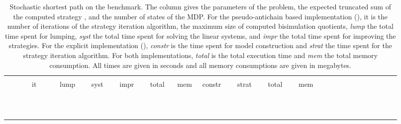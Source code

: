 \begin{table}[h!]
	\caption{Stochastic shortest path on the  benchmark. The column  gives the parameters of the problem,  the expected truncated sum of the computed strategy , and  the number of states of the MDP.
For the pseudo-antichain based implementation (), it is the number of iterations of the strategy iteration algorithm,  the maximum size of computed bisimulation quotients, \textit{lump} the total time spent for lumping, \textit{syst} the total time spent for solving the linear systems, and \textit{impr} the total time spent for improving the strategies. For the explicit implementation (), \textit{constr} is the time spent for model construction and \textit{strat} the time spent for the strategy iteration algorithm. For both implementations, \textit{total} is the total execution time and \textit{mem} the total memory consumption. All times are given in seconds and all memory consumptions are given in megabytes.}
	\label{table:STRIPS1}
	\centering
		\scriptsize
 		\begin{tabular}{|r|r|r||r|r|r|r|r|r|r||r|r|r|r|r|r|r|r|r|r|r|r|r|r|r|}
		\hline
	  	& & & \multicolumn{7}{|c||}{{\small }} & \multicolumn{4}{|c|}{{\small }}\rule[-2pt]{0pt}{10pt}\\
		 &   &   & \ it \  &  & \ lump  \ &  \ syst \  &  \ impr  \ & \  total \  & mem & \ constr \  & \ strat \ & \ total \ & \ mem\ \rule[-3pt]{0pt}{10pt}\\
\hline\hline
 &  &  &  &  &  &  &   &  &  &  &   &  & \rule[-3pt]{0pt}{10pt}\\
 &  &  &  &  &  &  &   &  &  &  &   &  & \rule[-3pt]{0pt}{10pt}\\
 &  &  &  &  &  &  &   &  &  &  &   &  & \rule[-3pt]{0pt}{10pt}\\
 &  &  &  &  &  &  &   &  &  &  &   &  & \rule[-3pt]{0pt}{10pt}\\
\hline  &  &  &  &  &  &  &   &  &  &  &   &  & \rule[-3pt]{0pt}{10pt}\\
 &  &  &  &  &  &  &   &  &  &  &   &  & \rule[-3pt]{0pt}{10pt}\\
 &  &  &  &  &  &  &   &  &  &  &   &  & \rule[-3pt]{0pt}{10pt}\\
 &  &  &  &  &  &  &   &  &  &  &   &  & \rule[-3pt]{0pt}{10pt}\\
\hline  &  &  &  &  &  &  &   &  &  &  &   &  & \rule[-3pt]{0pt}{10pt}\\
 &  &  &  &  &  &  &   &  &  &  &   &  & \rule[-3pt]{0pt}{10pt}\\
 &  &  &  &  &  &  &   &  &  &  &   &  & \rule[-3pt]{0pt}{10pt}\\

\end{tabular}
\end{table}
